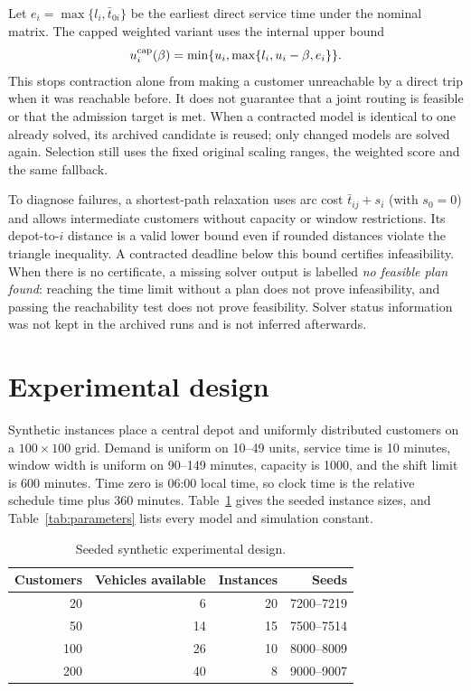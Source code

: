 \documentclass[11pt,a4paper]{article}
\begin{document}
Let $e_i=\max\{l_i,\bar t_{0i}\}$ be the earliest direct service time under the
nominal matrix. The capped weighted variant uses the internal upper bound
\begin{equation}
 u_i^{\rm cap}(\beta)=\min\{u_i,\max\{l_i,u_i-\beta,e_i\}\}.
\end{equation}
This stops contraction alone from making a customer unreachable by a direct
trip when it was reachable before. It does not guarantee that a joint routing is
feasible or that the admission target is met. When a contracted model is
identical to one already solved, its archived candidate is reused; only changed
models are solved again. Selection still uses the fixed original scaling ranges,
the weighted score and the same fallback.

To diagnose failures, a shortest-path relaxation uses arc cost
$\bar t_{ij}+s_i$ (with $s_0=0$) and allows intermediate customers without
capacity or window restrictions. Its depot-to-$i$ distance is a valid lower bound
even if rounded distances violate the triangle inequality. A contracted deadline
below this bound certifies infeasibility. When there is no certificate, a missing
solver output is labelled \emph{no feasible plan found}: reaching the time limit
without a plan does not prove infeasibility, and passing the reachability test
does not prove feasibility. Solver status information was not
kept in the archived runs and is not inferred afterwards.

\section{Experimental design}

Synthetic instances place a central depot and uniformly distributed customers
on a $100\times100$ grid. Demand is uniform on 10--49 units, service time is
10 minutes, window width is uniform on 90--149 minutes, capacity is 1000, and
the shift limit is 600 minutes. Time zero is 06:00 local time, so clock time is
the relative schedule time plus 360 minutes. Table~\ref{tab:design} gives the
seeded instance sizes, and Table~\ref{tab:parameters} lists every model and
simulation constant.

\begin{table}[ht]
\centering
\caption{Seeded synthetic experimental design.}
\label{tab:design}
\begin{tabular}{rrrr}
\toprule
Customers & Vehicles available & Instances & Seeds\\
\midrule
20  & 6  & 20 & 7200--7219\\
50  & 14 & 15 & 7500--7514\\
100 & 26 & 10 & 8000--8009\\
200 & 40 & 8  & 9000--9007\\
\bottomrule
\end{tabular}
\end{table}
\end{document}
